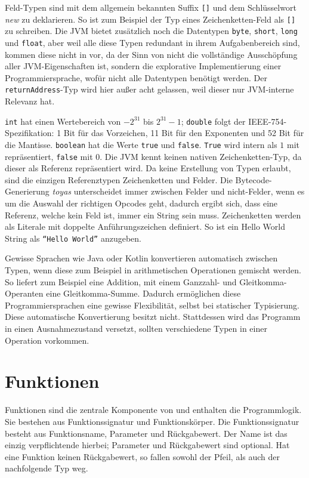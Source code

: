 Feld-Typen sind mit dem allgemein bekannten Suffix \texttt{[]} und dem Schlüsselwort \textit{new} zu deklarieren. So ist zum Beispiel der Typ eines Zeichenketten-Feld als \texttt{[]} zu schreiben. Die JVM bietet zusätzlich noch die Datentypen \texttt{byte}, \texttt{short}, \texttt{long} und \texttt{float}, aber weil alle diese Typen redundant in ihrem Aufgabenbereich sind, kommen diese nicht in \toya vor, da der Sinn von \toya nicht die vollständige Ausschöpfung aller JVM-Eigenschaften ist, sondern die explorative Implementierung einer Programmiersprache, wofür nicht alle Datentypen benötigt werden. Der \texttt{returnAddress}-Typ wird hier außer acht gelassen, weil dieser nur JVM-interne Relevanz hat.

\texttt{int} hat einen Wertebereich von $-2^{31}$ bis $2^{31} - 1$; \texttt{double} folgt der IEEE-754-Spezifikation: 1 Bit für das Vorzeichen, 11 Bit für den Exponenten und 52 Bit für die Mantisse. \texttt{boolean} hat die Werte \texttt{true} und \texttt{false}. \texttt{True} wird intern als $1$ mit repräsentiert, \texttt{false} mit 0. Die JVM kennt keinen nativen Zeichenketten-Typ, da dieser als Referenz repräsentiert wird. Da \toya keine Erstellung von Typen erlaubt, sind die einzigen Referenztypen Zeichenketten und Felder. Die Bytecode-Generierung \textit{toyas} unterscheidet immer zwischen Felder und nicht-Felder, wenn es um die Auswahl der richtigen Opcodes geht, dadurch ergibt sich, dass eine Referenz, welche kein Feld ist, immer ein String sein muss. Zeichenketten werden als Literale mit doppelte Anführungszeichen definiert. So ist ein Hello World String als \texttt{``Hello World''} anzugeben.

Gewisse Sprachen wie Java oder Kotlin konvertieren automatisch zwischen Typen, wenn diese zum Beispiel in arithmetischen Operationen gemischt werden. So liefert zum Beispiel eine Addition, mit einem Ganzzahl- und Gleitkomma-Operanten eine Gleitkomma-Summe. Dadurch ermöglichen diese Programmiersprachen eine gewisse Flexibilität, selbst bei statischer Typisierung. Diese automatische Konvertierung besitzt \toya nicht. Stattdessen wird das Programm in einen Ausnahmezustand versetzt, sollten verschiedene Typen in einer Operation vorkommen.

\section{Funktionen}

Funktionen sind die zentrale Komponente von \toya und enthalten die Programmlogik.
Sie bestehen aus Funktionssignatur und Funktionskörper. Die Funktionssignatur besteht aus Funktionsname, Parameter und Rückgabewert. Der Name ist das einzig verpflichtende hierbei; Parameter und Rückgabewert sind optional. Hat eine Funktion keinen Rückgabewert, so fallen sowohl der Pfeil, als auch der nachfolgende Typ weg.

